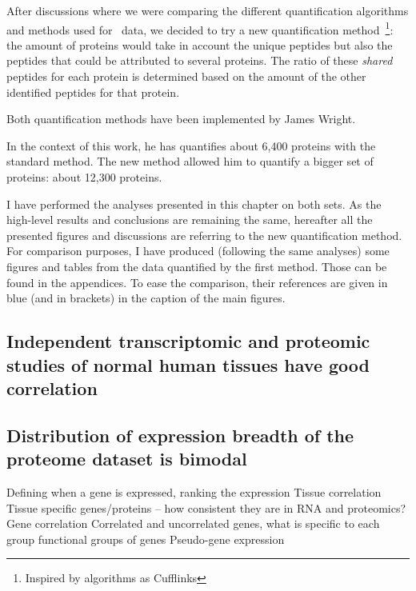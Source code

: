 After discussions where we were comparing the different quantification algorithms
and methods used for \Rnaseq\ data, we decided to try a new quantification
method~\footnote{Inspired by algorithms as Cufflinks}:
the amount of proteins would take in account the unique peptides but also the
peptides that could be attributed to several proteins.
The ratio of these \emph{shared} peptides for each protein
is determined based on the amount of the other identified peptides for that protein.

Both quantification methods have been implemented by James Wright.

In the context of this work, he has quantifies about 6,400 proteins with the standard method.
The new method allowed him to quantify a bigger set of proteins: about 12,300 proteins.


I have performed the analyses presented in this chapter on both sets. As the high-level
results and conclusions are remaining the same, hereafter all the presented figures
and discussions are referring to the new quantification method. For comparison
purposes, I have produced (following the same analyses) some figures and tables
from the data quantified by the first method. Those can be found in the
appendices. To ease the comparison, their references are given in blue
(and in brackets) in the caption of the main figures.

\subsection{Independent transcriptomic and proteomic studies of normal human tissues
have good correlation}


\subsection{Distribution of expression breadth of the proteome dataset is bimodal}


Defining when a gene is expressed, ranking the expression
Tissue correlation
Tissue specific genes/proteins – how consistent they are in RNA and proteomics?
Gene correlation
Correlated and uncorrelated genes, what is specific to each group
functional groups of genes
Pseudo-gene expression



